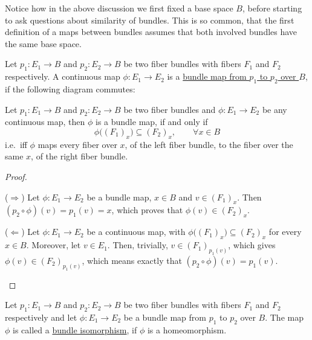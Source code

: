 Notice how in the above discussion we first fixed a base space $B$, before starting to ask questions about similarity of bundles. This is so common, that the first definition of a maps between bundles assumes that both involved bundles have the same base space.
\begin{definition}
Let $p_1:E_1\to B$ and $p_2:E_2\to B$ be two fiber bundles with fibers $F_1$ and $F_2$ respectively. A continuous map $\phi:E_1\to E_2$ is a \ul{bundle map from $p_1$ to $p_2$ over $B$}, if the following diagram commutes:
\begin{center}
\end{center}
\end{definition}

\begin{proposition}
Let $p_1:E_1\to B$ and $p_2:E_2\to B$ be two fiber bundles and $\phi:E_1\to E_2$ be any continuous map, then $\phi$ is a bundle map, if and only if
\[\phi\big({(F_1)}_x\big)\subseteq{(F_2)}_x,\qquad\forall x\in B\]
i.e.\ iff $\phi$ maps every fiber over $x$, of the left fiber bundle, to the fiber over the same $x$, of the right fiber bundle.
\end{proposition}
\begin{proof}
\begin{b_item}
\item[($\Rightarrow$)] Let $\phi:E_1\to E_2$ be a bundle map, $x\in B$ and $v\in {(F_1)}_x$. Then $(p_2\circ\phi)(v)=p_1(v)=x$, which proves that $\phi(v)\in{(F_2)}_x$.
\item[($\Leftarrow$)] Let $\phi:E_1\to E_2$ be a continuous map, with $\phi\big({(F_1)}_x\big)\subseteq{(F_2)}_x$ for every $x\in B$. Moreover, let $v\in E_1$. Then, trivially, $v\in {(F_1)}_{p_1(v)}$, which gives $\phi(v)\in {(F_2)}_{p_1(v)}$, which means exactly that $(p_2\circ\phi)(v)=p_1(v)$.\qedhere
\end{b_item}
\end{proof}

\begin{definition}
Let $p_1:E_1\to B$ and $p_2:E_2\to B$ be two fiber bundles with fibers $F_1$ and $F_2$ respectively and let $\phi:E_1\to E_2$ be a bundle map from $p_1$ to $p_2$ over $B$. The map $\phi$ is called a \ul{bundle isomorphism}, if $\phi$ is a homeomorphism.
\end{definition}

